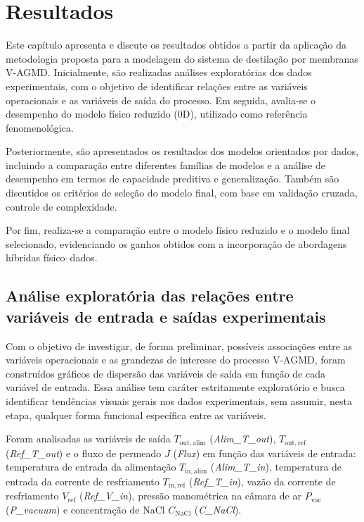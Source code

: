 \chapter{Resultados}
\label{chap6}


Este capítulo apresenta e discute os resultados obtidos a partir da aplicação da metodologia proposta para a modelagem do sistema de destilação por membranas V-AGMD. Inicialmente, são realizadas análises exploratórias dos dados experimentais, com o objetivo de identificar relações entre as variáveis operacionais e as variáveis de saída do processo. Em seguida, avalia-se o desempenho do modelo físico reduzido (0D), utilizado como referência fenomenológica.

Posteriormente, são apresentados os resultados dos modelos orientados por dados, incluindo a comparação entre diferentes famílias de modelos e a análise de desempenho em termos de capacidade preditiva e generalização. Também são discutidos os critérios de seleção do modelo final, com base em validação cruzada, controle de complexidade.

Por fim, realiza-se a comparação entre o modelo físico reduzido e o modelo final selecionado, evidenciando os ganhos obtidos com a incorporação de abordagens híbridas físico--dados.

\section{Análise exploratória das relações entre variáveis de entrada e saídas experimentais}

Com o objetivo de investigar, de forma preliminar, possíveis associações entre as variáveis operacionais e as grandezas de interesse do processo V-AGMD, foram construídos gráficos de dispersão das variáveis de saída em função de cada variável de entrada. Essa análise tem caráter estritamente exploratório e busca identificar tendências visuais gerais nos dados experimentais, sem assumir, nesta etapa, qualquer forma funcional específica entre as variáveis.

Foram analisadas as variáveis de saída \(T_{\mathrm{out,alim}}\) (\textit{Alim\_T\_out}), \(T_{\mathrm{out,ref}}\) (\textit{Ref\_T\_out}) e o fluxo de permeado \(J\) (\textit{Flux}) em função das variáveis de entrada: temperatura de entrada da alimentação \(T_{\mathrm{in,alim}}\) (\textit{Alim\_T\_in}), temperatura de entrada da corrente de resfriamento \(T_{\mathrm{in,ref}}\) (\textit{Ref\_T\_in}), vazão da corrente de resfriamento \(\dot{V}_{\mathrm{ref}}\) (\textit{Ref\_V\_in}), pressão manométrica na câmara de ar \(P_{\mathrm{vac}}\) (\textit{P\_vacuum}) e concentração de NaCl \(C_{\mathrm{NaCl}}\) (\textit{C\_NaCl}).

